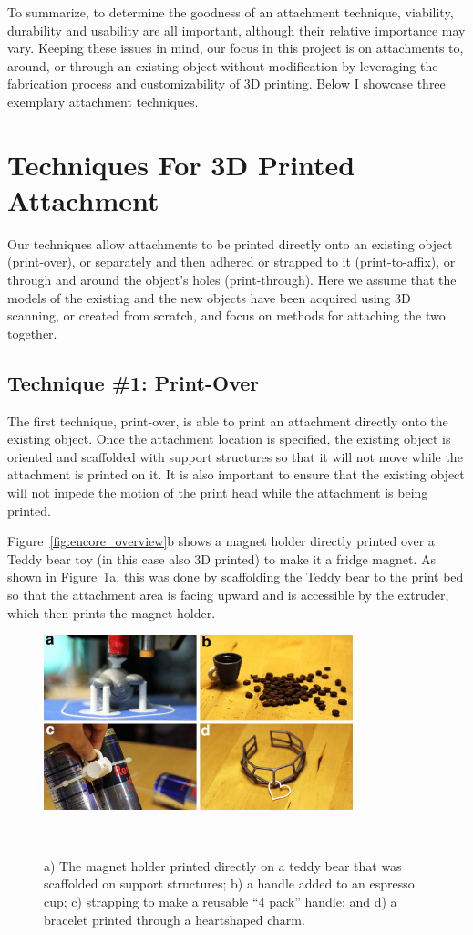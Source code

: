 To summarize, to determine the goodness of an attachment technique, viability, durability and usability are all important, although their relative importance may vary. Keeping these issues in mind, our focus in this project is on attachments to, around, or through an existing object without modification by leveraging the fabrication process and customizability of 3D printing. Below I showcase three exemplary attachment techniques.

\section{Techniques For 3D Printed Attachment}
Our techniques allow attachments to be printed directly onto an existing object (print-over), or separately and then adhered or strapped to it (print-to-affix), or through and around the object's holes (print-through). Here we assume that the models of the existing and the new objects have been acquired using 3D scanning, or created from scratch, and focus on methods for attaching the two together.

\subsection{Technique \#1: Print-Over}
The first technique, print-over, is able to print an attachment directly onto the existing object. Once the attachment location is specified, the existing object is oriented and scaffolded with support structures so that it will not move while the attachment is printed on it. It is also important to ensure that the existing object will not impede the motion of the print head while the attachment is being printed.

Figure~\ref{fig:encore_overview}b shows a magnet holder directly printed over a Teddy bear toy (in this case also 3D printed) to make it a fridge magnet. As shown in Figure~\ref{fig:encore_techniques}a, this was done by scaffolding the Teddy bear to the print bed so that the attachment area is facing upward and is accessible by the extruder, which then prints the magnet holder.

\begin{figure}[h]
  \centering
  \includegraphics[width=0.8\textwidth]{figures/encore_techniques.pdf}
  \caption{a) The magnet holder printed directly on a teddy bear that was scaffolded on support structures; b) a handle added to an espresso cup; c) strapping to make a reusable “4 pack” handle; and d) a bracelet printed through a heartshaped charm. }~\label{fig:encore_techniques}
\end{figure}

